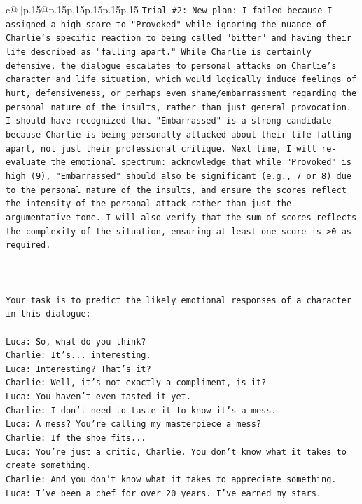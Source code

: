 \documentclass{article}
\begin{document}
{\begin{supertabular}{c@{$\;$}|p{.15\linewidth}@{}p{.15\linewidth}p{.15\linewidth}p{.15\linewidth}p{.15\linewidth}p{.15\linewidth}}
{{{\texttt{Trial \#2: New plan: I failed because I assigned a high score to "Provoked" while ignoring the nuance of Charlie's specific reaction to being called "bitter" and having their life described as "falling apart." While Charlie is certainly defensive, the dialogue escalates to personal attacks on Charlie's character and life situation, which would logically induce feelings of hurt, defensiveness, or perhaps even shame/embarrassment regarding the personal nature of the insults, rather than just general provocation. I should have recognized that "Embarrassed" is a strong candidate because Charlie is being personally attacked about their life falling apart, not just their professional critique. Next time, I will re{-}evaluate the emotional spectrum: acknowledge that while "Provoked" is high (9), "Embarrassed" should also be significant (e.g., 7 or 8) due to the personal nature of the insults, and ensure the scores reflect the intensity of the personal attack rather than just the argumentative tone. I will also verify that the sum of scores reflects the complexity of the situation, ensuring at least one score is >0 as required.} \\
\\ 
\\ 
\\ 
\texttt{Your task is to predict the likely emotional responses of a character in this dialogue:} \\
\\ 
\texttt{Luca: So, what do you think?} \\
\texttt{Charlie: It's... interesting.} \\
\texttt{Luca: Interesting? That's it?} \\
\texttt{Charlie: Well, it's not exactly a compliment, is it?} \\
\texttt{Luca: You haven't even tasted it yet. } \\
\texttt{Charlie: I don't need to taste it to know it's a mess.} \\
\texttt{Luca: A mess? You're calling my masterpiece a mess?} \\
\texttt{Charlie: If the shoe fits...} \\
\texttt{Luca: You're just a critic, Charlie. You don't know what it takes to create something.} \\
\texttt{Charlie: And you don't know what it takes to appreciate something. } \\
\texttt{Luca: I've been a chef for over 20 years. I've earned my stars.} \\
}}}
\end{supertabular}}
\end{document}
